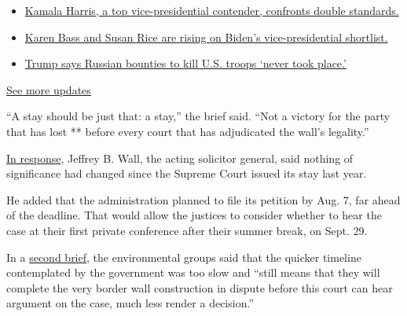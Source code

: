 \begin{itemize}
\tightlist
\item
  \href{https://www.nytimes.com/2020/07/31/us/elections/biden-vs-trump.html?action=click\&pgtype=Article\&state=default\&region=MAIN_CONTENT_1\&context=storylines_live_updates\#link-29fdff45}{Kamala
  Harris, a top vice-presidential contender, confronts double
  standards.}
\item
  \href{https://www.nytimes.com/2020/07/31/us/elections/biden-vs-trump.html?action=click\&pgtype=Article\&state=default\&region=MAIN_CONTENT_1\&context=storylines_live_updates\#link-13ec3d9c}{Karen
  Bass and Susan Rice are rising on Biden's vice-presidential
  shortlist.}
\item
  \href{https://www.nytimes.com/2020/07/31/us/elections/biden-vs-trump.html?action=click\&pgtype=Article\&state=default\&region=MAIN_CONTENT_1\&context=storylines_live_updates\#link-49e9a016}{Trump
  says Russian bounties to kill U.S. troops `never took place.'}
\end{itemize}

\href{https://www.nytimes.com/2020/07/31/us/elections/biden-vs-trump.html?action=click\&pgtype=Article\&state=default\&region=MAIN_CONTENT_1\&context=storylines_live_updates}{See
more updates}

``A stay should be just that: a stay,'' the brief said. ``Not a victory
for the party that has lost ** before every court that has adjudicated
the wall's legality.''

\href{https://www.supremecourt.gov/DocketPDF/19/19A60/148956/20200729131434023_19A60\%20Sierra\%20Club\%20-\%20Govt\%20Opp\%20to\%20Motion\%20to\%20Lift\%20Stay\%20-\%20final.pdf}{In
response}, Jeffrey B. Wall, the acting solicitor general, said nothing
of significance had changed since the Supreme Court issued its stay last
year.

He added that the administration planned to file its petition by Aug. 7,
far ahead of the deadline. That would allow the justices to consider
whether to hear the case at their first private conference after their
summer break, on Sept. 29.

In a
\href{https://www.supremecourt.gov/DocketPDF/19/19A60/149072/20200730130006392_2020.07.30\%20stay\%20lift\%20reply\%20FINAL.pdf}{second
brief}, the environmental groups said that the quicker timeline
contemplated by the government was too slow and ``still means that they
will complete the very border wall construction in dispute before this
court can hear argument on the case, much less render a decision.''

